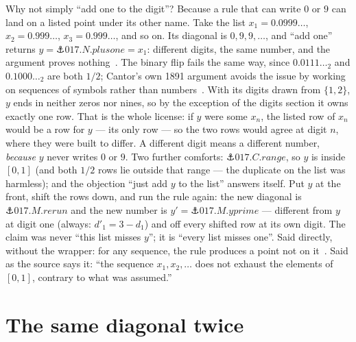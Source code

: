 \begin{narrative}
Why not simply ``add one to the digit''? Because a rule that can write
$0$ or $9$ can land on a listed point under its other name. Take the
list $x_1 = 0.0999\ldots$, $x_2 = 0.999\ldots$, $x_3 = 0.999\ldots$,
and so on. Its diagonal is $0, 9, 9, \ldots$, and ``add one'' returns
$y = \anchor{017.N.plusone} = x_1$: different digits, the same number,
and the argument proves nothing~\cite{probability-michael-sipser-introduction-to-the-theory-of-computation-3rd}.
The binary flip fails the same way, since $0.0111\ldots_2$ and
$0.1000\ldots_2$ are both $1/2$; Cantor's own 1891 argument avoids the
issue by working on sequences of symbols rather than
numbers~\cite{probability-wikipedia-cantor-s-diagonal-argument}. With
its digits drawn from $\{1, 2\}$, $y$ ends in neither zeros nor nines,
so by the exception of the digits section it owns exactly one row.
That is the whole license: if $y$ were some $x_n$, the listed row of
$x_n$ would be a row for $y$ — its only row — so the two rows would
agree at digit $n$, where they were built to differ. A different digit
means a different number, \emph{because} $y$ never writes $0$ or $9$.
Two further comforts: $\anchor{017.C.range}$, so $y$ is inside $[0,1]$
(and both $1/2$ rows lie outside that range — the duplicate on the
list was harmless); and the objection ``just add $y$ to the list''
answers itself. Put $y$ at the front, shift the rows down, and run the
rule again: the new diagonal is $\anchor{017.M.rerun}$ and the new
number is $y' = \anchor{017.M.yprime}$ — different from $y$ at digit
one (always: $d'_1 = 3 - d_1$) and off every shifted row at its own
digit. The claim was never ``this list misses $y$''; it is ``every list
misses one''. Said directly, without the wrapper: for any sequence, the
rule produces a point not on
it~\cite{probability-andrej-bauer-proof-of-negation-and-proof-by-contradiction-20}.
Said as the source says it: ``the sequence $x_1, x_2, \ldots$ does not
exhaust the elements of $[0,1]$, contrary to what was assumed.''

\section{The same diagonal twice}


\end{narrative}

